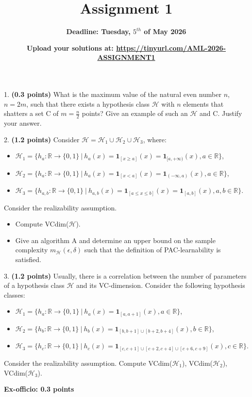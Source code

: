 \documentclass{article}
\title{\textbf{Assignment 1}}
\author{\textbf{\color{red} {Deadline: Tuesday, $5^{th}$ of May 2026}}}
\date{\textbf{\color{red} Upload your solutions at: \url{https://tinyurl.com/AML-2026-ASSIGNMENT1}
}}
\def\sone{{\textbf{1}}}
\begin{document}
\maketitle

1. \textbf{(0.3 points)} What is the maximum value of the natural even number $n$, $n=2m$, such that there exists a hypothesis class $\mathcal{H}$ with $n$ elements that shatters a set C of $m = \frac{n}{2}$ points? Give an example of such an $\mathcal{H}$ and C. Justify your answer.




\vspace{5mm}

2. \textbf{(1.2 points)} Consider $\mathcal{H} = \mathcal{H}_1 \cup \mathcal{H}_2 \cup \mathcal{H}_3$, where:

\begin{itemize}
    \setlength{\itemindent}{-6mm}
    \item[] $\mathcal{H}_1 = \{h_{a} : \mathbb{R} \rightarrow \{0,1\} \ | \ h_{a}(x) = \sone_{[x \geq a]}(x) = \sone_{[a, +\infty)}(x), a \in \mathbb{R}\}$,
    \item[] $\mathcal{H}_2 = \{h_{a} : \mathbb{R} \rightarrow \{0,1\} \ | \ h_{a}(x) = \sone_{[x < a]}(x) = \sone_{(-\infty, a)}(x), a \in \mathbb{R}\}$,
    \item[] $\mathcal{H}_3 = \{h_{a, b} : \mathbb{R} \rightarrow \{0,1\} \ | \ h_{a, b}(x) = \sone_{[a \leq x \leq b]}(x) = \sone_{[a, b]}(x), a, b \in \mathbb{R}\}$.
\end{itemize}    

Consider the realizability assumption.

\begin{itemize}
    \item[a)] Compute VCdim($\mathcal{H}$).
    \item[b)] Give an algorithm A and determine an upper bound on the sample complexity $m_{\mathcal{H}}(\epsilon, \delta)$ such that the definition of PAC-learnability is satisfied.
    
\end{itemize}



3. \textbf{(1.2 points)} Usually, there is a correlation between the number of parameters of a hypothesis class $\mathcal{H}$ and its VC-dimension. Consider the following hypothesis classes:

\begin{itemize}
    \setlength{\itemindent}{-6mm}
    \item[] $\mathcal{H}_1 = \{h_{a} : \mathbb{R} \rightarrow \{0,1\} \ | \ h_{a}(x) = \sone_{[a, a+1]}(x), a \in \mathbb{R}\}$,
    \item[] $\mathcal{H}_2 = \{h_{b} : \mathbb{R} \rightarrow \{0,1\} \ | \ h_{b}(x) = \sone_{[b,b+1] \cup [b+2,b+4]}(x), b \in \mathbb{R}\}$,
    \item[] $\mathcal{H}_3 = \{h_{c} : \mathbb{R} \rightarrow \{0,1\} \ | \ h_{c}(x) = \sone_{[c,c+1] \cup [c+2,c+4] \cup [c+6,c+9]}(x), c \in \mathbb{R}\}$.
\end{itemize}    

Consider the realizability assumption.  Compute VCdim($\mathcal{H}_1$), VCdim($\mathcal{H}_2$), VCdim($\mathcal{H}_3$).

\vspace{5mm}


\textbf{Ex-officio: 0.3 points}
\end{document}
